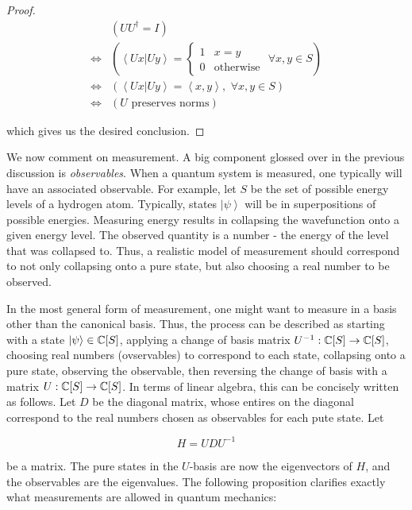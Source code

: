 \documentclass{article}
\theoremstyle{definition}
\numberwithin{figure}{section}
\begin{document}
\begin{proof}
\begin{align*}
&\left(UU^{\dagger}=I\right)\\
\iff&\left(\left<Ux|Uy\right>=
\begin{cases}
1 & x=y\\
0 & \text{otherwise}
\end{cases}\,\, \forall x,y\in S\right)\\
\iff & \left(\left<Ux|Uy\right>=\left<x,y\right>,\,\, \forall x,y\in S\right)\\
\iff & \left(U\text{ preserves norms}\right)
\end{align*}

which gives us the desired conclusion.
\end{proof}

We now comment on measurement. A big component glossed over in the previous discussion is \textit{observables}. When a quantum system is measured, one typically will have an associated observable. For example, let $S$ be the set of possible energy levels of a hydrogen atom. Typically, states $\left|\psi\right>$ will be in superpositions of possible energies. Measuring energy results in collapsing the wavefunction onto a given energy level. The observed quantity is a number - the energy of the level that was collapsed to. Thus, a realistic model of measurement should correspond to not only collapsing onto a pure state, but also choosing a real number to be observed.

In the most general form of measurement, one might want to measure in a basis other than the canonical basis. Thus, the process can be described as starting with a state $\left|\psi\right> \in \mathbb{C}[S]$, applying a change of basis matrix $U^{-1}: \mathbb{C}[S]\to \mathbb{C}[S]$, choosing real numbers (ovservables) to correspond to each state, collapsing onto a pure state, observing the observable, then reversing the change of basis with a matrix $U: \mathbb{C}[S]\to \mathbb{C}[S]$. In terms of linear algebra, this can be concisely written as follows. Let $D$ be the diagonal matrix, whose entires on the diagonal correspond to the real numbers chosen as observables for each pute state. Let

$$H=UDU^{-1}$$

be a matrix. The pure states in the $U$-basis are now the eigenvectors of $H$, and the observables are the eigenvalues. The following proposition clarifies exactly what measurements are allowed in quantum mechanics:
\end{document}
